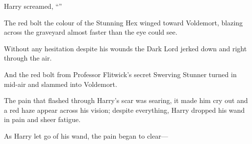 Harry screamed, “”

The red bolt the colour of the Stunning Hex winged toward Voldemort, blazing across the graveyard almost faster than the eye could see.

Without any hesitation despite his wounds the Dark Lord jerked down and right through the air.

And the red bolt from Professor Flitwick’s secret Swerving Stunner turned in mid-air and slammed into Voldemort.

The pain that flashed through Harry’s scar was searing, it made him cry out and a red haze appear across his vision; despite everything, Harry dropped his wand in pain and sheer fatigue.

As Harry let go of his wand, the pain began to clear—

